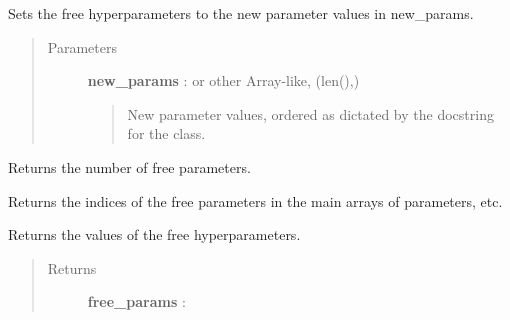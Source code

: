 \documentclass[letterpaper,10pt,english]{sphinxmanual}
\begin{document}
\begin{fulllineitems}
\begin{fulllineitems}
\label{gptools.kernel:gptools.kernel.core.Kernel.set_hyperparams}
Sets the free hyperparameters to the new parameter values in new\_params.
\begin{quote}\begin{description}
\item[{Parameters}] \leavevmode
\textbf{new\_params} :  or other Array-like, (len(),)
\begin{quote}

New parameter values, ordered as dictated by the docstring for the
class.
\end{quote}

\end{description}\end{quote}

\end{fulllineitems}


\begin{fulllineitems}
\label{gptools.kernel:gptools.kernel.core.Kernel.num_free_params}
Returns the number of free parameters.

\end{fulllineitems}


\begin{fulllineitems}
\label{gptools.kernel:gptools.kernel.core.Kernel.free_param_idxs}
Returns the indices of the free parameters in the main arrays of parameters, etc.

\end{fulllineitems}


\begin{fulllineitems}
\label{gptools.kernel:gptools.kernel.core.Kernel.free_params}
Returns the values of the free hyperparameters.
\begin{quote}\begin{description}
\item[{Returns}] \leavevmode
\textbf{free\_params} : 
\begin{quote}


\end{quote}
\end{description}
\end{quote}
\end{fulllineitems}
\end{fulllineitems}
\end{document}
